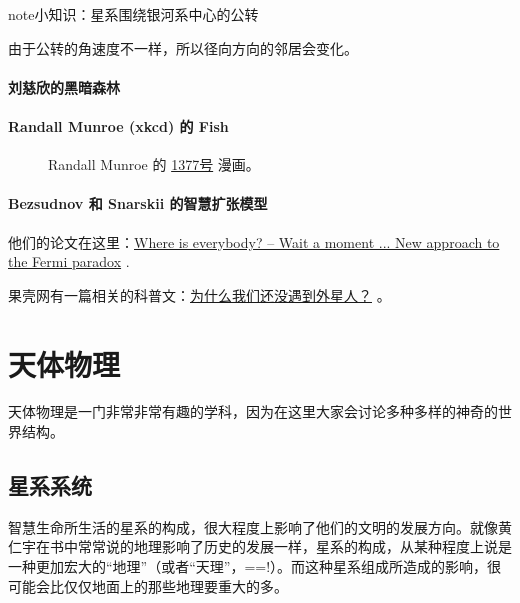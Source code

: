 \documentclass[letterpaper,10pt,english]{sphinxmanual}
\begin{document}
\begin{notice}{note}{小知识：星系围绕银河系中心的公转}

由于公转的角速度不一样，所以径向方向的邻居会变化。
\end{notice}


\paragraph{刘慈欣的黑暗森林}
\label{physics:id21}\label{physics:index-9}

\paragraph{Randall Munroe (xkcd) 的 Fish}
\label{physics:randall-munroe-xkcd-fish}\begin{figure}[htbp]
\centering
\capstart
\caption{Randall Munroe 的 \href{http://xkcd.com/1377/}{1377号} 漫画。}\end{figure}


\paragraph{Bezsudnov 和 Snarskii 的智慧扩张模型}
\label{physics:bezsudnov-snarskii}\label{physics:index-11}
他们的论文在这里：\href{http://arxiv.org/abs/1007.2774}{Where is everybody? -- Wait a moment ... New approach to the Fermi paradox} .

果壳网有一篇相关的科普文：\href{http://www.guokr.com/article/129942/}{为什么我们还没遇到外星人？} 。


\section{天体物理}
\label{astro::doc}\label{astro:id1}
天体物理是一门非常非常有趣的学科，因为在这里大家会讨论多种多样的神奇的世界结构。


\subsection{星系系统}
\label{astro:id2}
智慧生命所生活的星系的构成，很大程度上影响了他们的文明的发展方向。就像黄仁宇在书中常常说的地理影响了历史的发展一样，星系的构成，从某种程度上说是一种更加宏大的“地理”（或者“天理”，==!）。而这种星系组成所造成的影响，很可能会比仅仅地面上的那些地理要重大的多。
\end{document}
